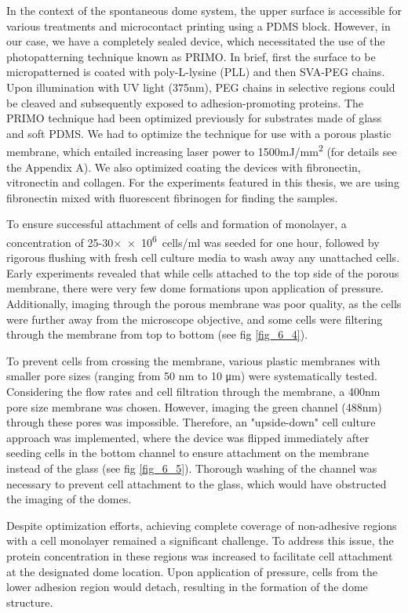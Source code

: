 In the context of the spontaneous dome system, the upper surface is accessible for various treatments and microcontact printing using a PDMS block. However, in our case, we have a completely sealed device, which necessitated the use of the photopatterning technique known as PRIMO. In brief, first the surface to be micropatterned is coated with poly-L-lysine (PLL) and then SVA-PEG chains. Upon illumination with UV light (375\unit{\nm}), PEG chains in selective regions could be cleaved and subsequently exposed to adhesion-promoting proteins. The PRIMO technique had been optimized previously for substrates made of glass and soft PDMS. We had to optimize the technique for use with a porous plastic membrane, which entailed increasing laser power to 1500\unit{mJ/\mm^2} (for details see the Appendix A). We also optimized coating the devices with fibronectin, vitronectin and collagen. For the experiments featured in this thesis, we are using fibronectin mixed with fluorescent fibrinogen for finding the samples.

To ensure successful attachment of cells and formation of monolayer, a concentration of 25-30×\unit{\num{e6} cells/\ml} was seeded for one hour, followed by rigorous flushing with fresh cell culture media to wash away any unattached cells. Early experiments revealed that while cells attached to the top side of the porous membrane, there were very few dome formations upon application of pressure. Additionally, imaging through the porous membrane was poor quality, as the cells were further away from the microscope objective, and some cells were filtering through the membrane from top to bottom (see fig \ref{fig_6_4}).  

To prevent cells from crossing the membrane, various plastic membranes with smaller pore sizes (ranging from 50 \unit{\nm} to 10 \unit{\um}) were systematically tested. Considering the flow rates and cell filtration through the membrane, a 400\unit{\nm} pore size membrane was chosen. However, imaging the green channel (488\unit{\nm}) through these pores was impossible. Therefore, an "upside-down" cell culture approach was implemented, where the device was flipped immediately after seeding cells in the bottom channel to ensure attachment on the membrane instead of the glass (see fig \ref{fig_6_5}). Thorough washing of the channel was necessary to prevent cell attachment to the glass, which would have obstructed the imaging of the domes.

Despite optimization efforts, achieving complete coverage of non-adhesive regions with a cell monolayer remained a significant challenge. To address this issue, the protein concentration in these regions was increased to facilitate cell attachment at the designated dome location. Upon application of pressure, cells from the lower adhesion region would detach, resulting in the formation of the dome structure.

